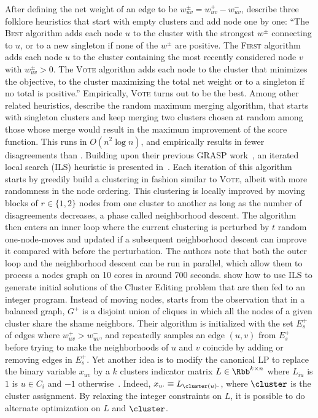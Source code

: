 After defining the net weight of an edge to be $w^\pm_{uv} = w^+_{uv} - w^-_{uv}$,
\textcite{Elsner2009} describe three folklore heuristics that start with empty clusters and add node
one by one: \enquote{The \textsc{Best} algorithm adds each node $u$ to the cluster with the
strongest $w^\pm$ connecting to $u$, or to a new singleton if none of the $w^\pm$ are positive.
The \textsc{First} algorithm adds each node $u$ to the cluster containing the most recently
considered node $v$ with $w^\pm_{uv} > 0$. The \textsc{Vote} algorithm adds each node to the cluster
that minimizes the \pcc{} objective, \ie{} to the cluster maximizing the total net weight
or to a singleton if no total is positive.} Empirically, \textsc{Vote} turns out to be the best.
Among other related heuristics, \textcite{mergingHeuristics14} describe the random maximum merging
algorithm, that starts with singleton clusters and keep merging two clusters chosen at random among
those whose merge would result in the maximum improvement of the score function. This runs in
$O(n^2\log n)$, and empirically results in fewer disagreements than \ccpivot{}.
Building upon their previous GRASP work~\autocite{GRASP13}, an iterated local search (ILS) heuristic is
presented in~\autocites{Levorato2015}{Levorato2017}. Each iteration of this algorithm starts by
greedily build a clustering in fashion similar to \textsc{Vote}, albeit with more randomness in the
node ordering. This clustering is locally improved by moving blocks of $r\in\{1,2\}$ nodes from one
cluster to another as long as the number of disagreements decreases, a phase called neighborhood
descent. The algorithm then enters an inner loop where the current clustering is perturbed by $t$
random one-node-moves and updated if a subsequent neighborhood descent can improve it compared with
before the perturbation. The authors note that both the outer loop and the neighborhood descent can
be run in parallel, which allow them to process a  nodes graph on 10 cores in around 700
seconds. \Textcite{heuristicCE16} show how to use ILS to generate initial solutions of the Cluster
Editing problem that are then fed to an integer program.
Instead of
moving nodes, \textcite{restoreNeighborhood13} starts from the observation that in a balanced
graph, $G^+$ is a disjoint union of cliques in which all the nodes of a given cluster share the shame
neighbors. Their algorithm is initialized with the set $E_s^+$ of edges where $w^+_{uv} > w^-_{uv}$,
and repeatedly samples an edge $(u,v)$ from $E_s^+$ before trying to make the neighborhoods of $u$
and $v$ coincide by adding or removing edges in $E_s^+$.  Yet another idea is to modify the
canonical LP to replace the binary variable $x_{uv}$ by a $k$ clusters indicator matrix
$L\in\Rbb^{k\times n}$ where $L_{iu}$ is $1$ is $u\in C_i$ and $-1$
otherwise~\autocite{AltOptimLP13}. Indeed, $x_{u\cdot} \equiv L_{\cluster(u)\cdot}$, where $\cluster$
is the cluster assignment. By relaxing the integer constraints on $L$, it is possible to do
alternate optimization on $L$ and $\cluster$.

